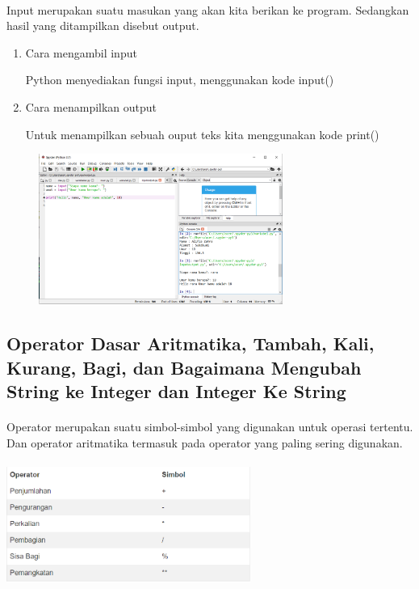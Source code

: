 \paragraph{} Input merupakan suatu masukan yang akan kita berikan ke program. Sedangkan hasil yang ditampilkan disebut output.
\begin{enumerate}
    \item Cara mengambil input
        \par Python menyediakan fungsi input, menggunakan kode input()
    \item Cara menampilkan output
        \par Untuk menampilkan sebuah ouput teks kita menggunakan kode print()
\end{enumerate}
\begin{figure}[h]
                 \centerline{\includegraphics[width=8cm]{figures/inputoutput.PNG}}
\end{figure}


\subsection{Operator Dasar Aritmatika, Tambah, Kali, Kurang, Bagi, dan Bagaimana Mengubah String ke Integer dan Integer Ke String}
\paragraph{} Operator merupakan suatu simbol-simbol yang digunakan untuk operasi tertentu. Dan operator aritmatika termasuk pada operator yang paling sering digunakan. 
\paragraph{}
    \centerline{\includegraphics[width=8cm]{figures/operatoraritmetika.PNG}}
